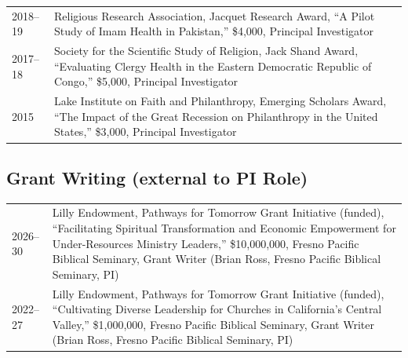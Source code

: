 \begin{longtable}{p{} p{}}
2018--19 & Religious Research Association, Jacquet Research Award, ``A Pilot Study of Imam Health in Pakistan,'' \$4,000, Principal Investigator\\

2017--18 & Society for the Scientific Study of Religion, Jack Shand Award, ``Evaluating Clergy Health in the Eastern Democratic Republic of Congo,'' \$5,000, Principal Investigator\\


2015 & Lake Institute on Faith and Philanthropy, Emerging Scholars Award, ``The Impact of the Great Recession on Philanthropy in the United States,'' \$3,000, Principal Investigator\\
\end{longtable}

\subsection*{Grant Writing (external to PI Role)}
\begin{longtable}{p{} p{}}
2026--30 & Lilly Endowment, Pathways for Tomorrow Grant Initiative (funded), ``Facilitating Spiritual Transformation and Economic Empowerment for Under-Resources Ministry Leaders,'' \$10,000,000, Fresno Pacific Biblical Seminary, Grant Writer (Brian Ross, Fresno Pacific Biblical Seminary, PI)\\

2022--27 & Lilly Endowment, Pathways for Tomorrow Grant Initiative (funded), ``Cultivating Diverse Leadership for Churches in California’s Central Valley,'' \$1,000,000, Fresno Pacific Biblical Seminary, Grant Writer (Brian Ross, Fresno Pacific Biblical Seminary, PI)\\
\end{longtable}
